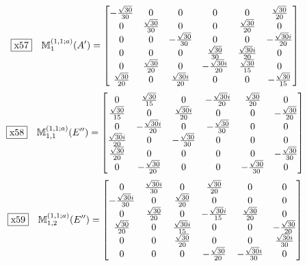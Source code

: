 \documentclass[fleqn,10pt,landscape]{jsarticle}
\begin{document}
\begin{dmath*}
\fbox{x57}\quad \mathbb{M}_{1}^{(1,1;a)}(A^{\prime})=\begin{bmatrix} - \frac{\sqrt{30}}{30} & 0 & 0 & 0 & 0 & \frac{\sqrt{30}}{20} \\ 0 & \frac{\sqrt{30}}{30} & 0 & 0 & \frac{\sqrt{30}}{20} & 0 \\ 0 & 0 & - \frac{\sqrt{30}}{30} & 0 & 0 & - \frac{\sqrt{30} i}{20} \\ 0 & 0 & 0 & \frac{\sqrt{30}}{30} & \frac{\sqrt{30} i}{20} & 0 \\ 0 & \frac{\sqrt{30}}{20} & 0 & - \frac{\sqrt{30} i}{20} & \frac{\sqrt{30}}{15} & 0 \\ \frac{\sqrt{30}}{20} & 0 & \frac{\sqrt{30} i}{20} & 0 & 0 & - \frac{\sqrt{30}}{15} \end{bmatrix}
\end{dmath*}
\begin{dmath*}
\fbox{x58}\quad \mathbb{M}_{1,1}^{(1,1;a)}(E^{\prime\prime})=\begin{bmatrix} 0 & \frac{\sqrt{30}}{15} & 0 & - \frac{\sqrt{30} i}{20} & \frac{\sqrt{30}}{20} & 0 \\ \frac{\sqrt{30}}{15} & 0 & \frac{\sqrt{30} i}{20} & 0 & 0 & - \frac{\sqrt{30}}{20} \\ 0 & - \frac{\sqrt{30} i}{20} & 0 & - \frac{\sqrt{30}}{30} & 0 & 0 \\ \frac{\sqrt{30} i}{20} & 0 & - \frac{\sqrt{30}}{30} & 0 & 0 & 0 \\ \frac{\sqrt{30}}{20} & 0 & 0 & 0 & 0 & - \frac{\sqrt{30}}{30} \\ 0 & - \frac{\sqrt{30}}{20} & 0 & 0 & - \frac{\sqrt{30}}{30} & 0 \end{bmatrix}
\end{dmath*}
\begin{dmath*}
\fbox{x59}\quad \mathbb{M}_{1,2}^{(1,1;a)}(E^{\prime\prime})=\begin{bmatrix} 0 & \frac{\sqrt{30} i}{30} & 0 & \frac{\sqrt{30}}{20} & 0 & 0 \\ - \frac{\sqrt{30} i}{30} & 0 & \frac{\sqrt{30}}{20} & 0 & 0 & 0 \\ 0 & \frac{\sqrt{30}}{20} & 0 & - \frac{\sqrt{30} i}{15} & \frac{\sqrt{30}}{20} & 0 \\ \frac{\sqrt{30}}{20} & 0 & \frac{\sqrt{30} i}{15} & 0 & 0 & - \frac{\sqrt{30}}{20} \\ 0 & 0 & \frac{\sqrt{30}}{20} & 0 & 0 & \frac{\sqrt{30} i}{30} \\ 0 & 0 & 0 & - \frac{\sqrt{30}}{20} & - \frac{\sqrt{30} i}{30} & 0 \end{bmatrix}
\end{dmath*}
\end{document}
